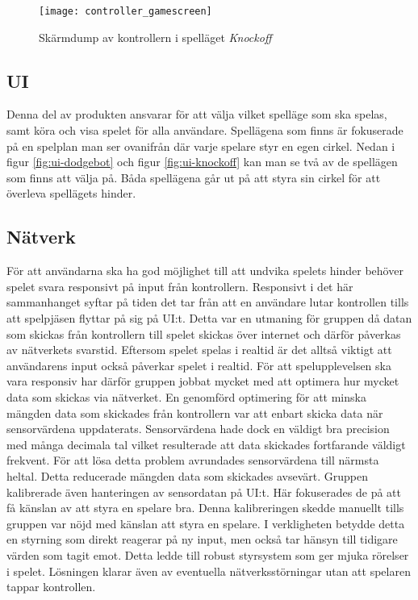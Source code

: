 \begin{figure}[h]
    \centering
    \texttt{[image: controller\_gamescreen]}
    \caption{Skärmdump av kontrollern i spelläget \textit{Knockoff}}
    \label{fig:controller_gamescreen}
\end{figure}

\subsection{UI}
Denna del av produkten ansvarar för att välja vilket spelläge som ska spelas, samt köra och visa spelet för alla användare. Spellägena som finns är fokuserade på en spelplan man ser ovanifrån där varje spelare styr en egen cirkel. Nedan i figur \ref{fig:ui-dodgebot} och figur \ref{fig:ui-knockoff} kan man se två av de spellägen som finns att välja på. Båda spellägena går ut på att styra sin cirkel för att överleva spellägets hinder. 

\subsection{Nätverk}
För att användarna ska ha god möjlighet till att undvika spelets hinder behöver spelet svara responsivt på input från kontrollern. Responsivt i det här sammanhanget syftar på tiden det tar från att en användare lutar kontrollen tills att spelpjäsen flyttar på sig på UI:t. Detta var en utmaning för gruppen då datan som skickas från kontrollern till spelet skickas över internet och därför påverkas av nätverkets svarstid. Eftersom spelet spelas i realtid är det alltså viktigt att användarens input också påverkar spelet i realtid. För att spelupplevelsen ska vara responsiv har därför gruppen jobbat mycket med att optimera hur mycket data som skickas via nätverket. En genomförd optimering för att minska mängden data som skickades från kontrollern var att enbart skicka data när sensorvärdena uppdaterats. Sensorvärdena hade dock en väldigt bra precision med många decimala tal vilket resulterade att data skickades fortfarande väldigt frekvent. För att lösa detta problem avrundades sensorvärdena till närmsta heltal. Detta reducerade mängden data som skickades avsevärt. Gruppen kalibrerade även hanteringen av sensordatan på UI:t. Här fokuserades de på att få känslan av att styra en spelare bra. Denna kalibreringen skedde manuellt tills gruppen var nöjd med känslan att styra en spelare. I verkligheten betydde detta en styrning som direkt reagerar på ny input, men också tar hänsyn till tidigare värden som tagit emot. Detta ledde till robust styrsystem som ger mjuka rörelser i spelet. Lösningen klarar även av eventuella nätverksstörningar utan att spelaren tappar kontrollen. 

